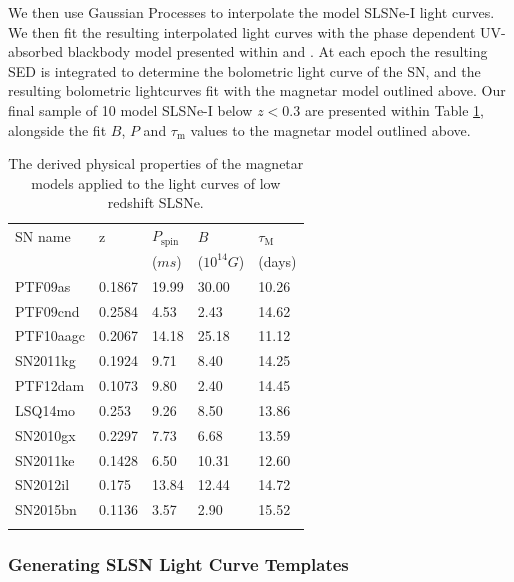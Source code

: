 \documentclass[a4paper,fleqn,usenatbib]{mnras}
\begin{document}
We then use Gaussian Processes to interpolate the model SLSNe-I light curves. We then fit the resulting interpolated light curves with the phase dependent UV-absorbed blackbody model presented within \cite{Inserra2017Euclid} and \cite{Angus2019}. At each epoch the resulting SED is integrated to determine the bolometric light curve of the SN, and the resulting bolometric lightcurves fit with the magnetar model outlined above. Our final sample of 10 model SLSNe-I below $z<0.3$ are presented within Table \ref{tab:slsnproperties}, alongside the fit $B$, $P$ and $\tau_{\mathrm{m}}$ values to the magnetar model outlined above. 

\begin{table}
	\caption{The derived physical properties of the magnetar models applied to the light curves of low redshift SLSNe.}
	\centering
	\begin{tabular}{l l l l l} 
		\hline
		SN name 	&  z  	&  $P_{\mathrm{spin}}$	 &$B$& $\tau_{\mathrm{M}}$	 \\
		  		&       & ($ms$) 				& ($10^{14}G$)& (days)			 \\
		\hline
        PTF09as     &0.1867 &     19.99 &	30.00 &	10.26 \\
        PTF09cnd    &0.2584&     4.53  &  2.43 &14.62 \\
        PTF10aagc   & 0.2067&     14.18 &	25.18 &11.12 \\ 
        SN2011kg    &0.1924&     9.71  &  8.40 &14.25 \\
        PTF12dam    &0.1073&     9.80 &	2.40 &	14.45 \\
        LSQ14mo     &0.253&     9.26  &  8.50 &	13.86 \\
        SN2010gx    &0.2297&     7.73  &  6.68 & 13.59  \\
        SN2011ke    &0.1428&     6.50 &	10.31 &	12.60 \\
        SN2012il    &0.175&     13.84 &  12.44 & 14.72 \\
        SN2015bn    &0.1136 &     3.57  &  2.90 & 15.52 \\ 
		\hline
		\label{tab:slsnproperties}
	\end{tabular}
 \end{table}



\subsubsection{Generating SLSN Light Curve Templates}
\end{document}
